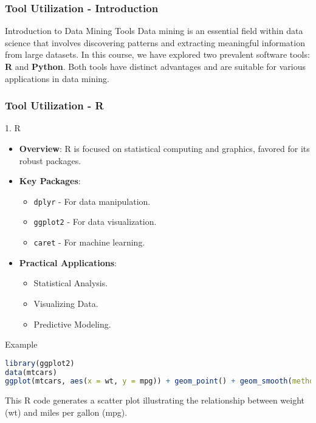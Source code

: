 \documentclass[aspectratio=169]{beamer}
\begin{document}
\begin{frame}
    \frametitle{Tool Utilization - Introduction}
    \begin{block}{Introduction to Data Mining Tools}
        Data mining is an essential field within data science that involves discovering patterns and extracting meaningful information from large datasets. In this course, we have explored two prevalent software tools: \textbf{R} and \textbf{Python}. Both tools have distinct advantages and are suitable for various applications in data mining.
    \end{block}
\end{frame}

\begin{frame}[fragile]
    \frametitle{Tool Utilization - R}
    \begin{block}{1. R}
        \begin{itemize}
            \item \textbf{Overview}: R is focused on statistical computing and graphics, favored for its robust packages.
            \item \textbf{Key Packages}:
            \begin{itemize}
                \item \texttt{dplyr} - For data manipulation.
                \item \texttt{ggplot2} - For data visualization.
                \item \texttt{caret} - For machine learning.
            \end{itemize}
            \item \textbf{Practical Applications}:
            \begin{itemize}
                \item Statistical Analysis.
                \item Visualizing Data.
                \item Predictive Modeling.
            \end{itemize}
        \end{itemize}
    \end{block}
    
    \begin{block}{Example}
        \begin{lstlisting}[language=R]
library(ggplot2)
data(mtcars)
ggplot(mtcars, aes(x = wt, y = mpg)) + geom_point() + geom_smooth(method = "lm")
        \end{lstlisting}
        This R code generates a scatter plot illustrating the relationship between weight (wt) and miles per gallon (mpg).
    \end{block}
\end{frame}
\end{document}

